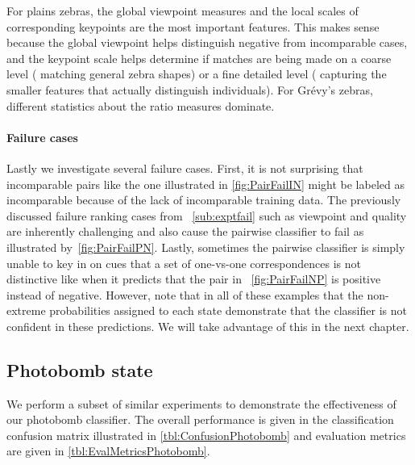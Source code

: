         For plains zebras, the global viewpoint measures and the local scales of corresponding keypoints are the
          most important features.
        This makes sense because the global viewpoint helps distinguish negative from incomparable cases, and the
          keypoint scale helps determine if matches are being made on a coarse level (\eg{} matching general zebra
          shapes) or a fine detailed level (\ie{} capturing the smaller features that actually distinguish
          individuals).
        For Grévy's zebras, different statistics about the ratio measures dominate.



        \MatchWordCloud{}
        \ImportantMatchFeat{}

        \paragraph{Failure cases}

        Lastly we investigate several failure cases.
        First, it is not surprising that incomparable pairs like the one illustrated in \cref{fig:PairFailIN}
          might be labeled as incomparable because of the lack of incomparable training data.
        The previously discussed failure ranking cases from ~\cref{sub:exptfail} such as viewpoint and quality
          are inherently challenging and also cause the pairwise classifier to fail as illustrated
          by~\cref{fig:PairFailPN}.
        Lastly, sometimes the pairwise classifier is simply unable to key in on cues that a set of one-vs-one
          correspondences is not distinctive like when it predicts that the pair in ~\cref{fig:PairFailNP} is
          positive instead of negative.
        However, note that in all of these examples that the non-extreme probabilities assigned to each state
          demonstrate that the classifier is not confident in these predictions.
        We will take advantage of this in the next chapter.
        

        \PairFailIN{} 

        \PairFailPN{}

        \PairFailNP{}

        \FloatBarrier{}


    \subsection{Photobomb state}
        We perform a subset of similar experiments to demonstrate the effectiveness of our photobomb classifier.
        The overall performance is given in the classification confusion matrix illustrated in
          \cref{tbl:ConfusionPhotobomb} and evaluation metrics are given in \cref{tbl:EvalMetricsPhotobomb}.

